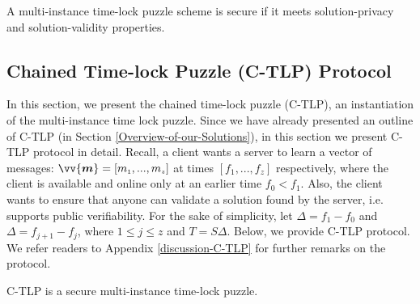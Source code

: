 % 
\begin{definition}\label{def::C-TLP-security} A multi-instance time-lock puzzle scheme  is secure if it meets solution-privacy and solution-validity properties. 
\end{definition}

\vspace{-6mm}

\subsection{Chained  Time-lock Puzzle (C-TLP) Protocol}\label{Section::C-TLP-protocol}

\vspace{-1mm}

In this section, we present the chained  time-lock puzzle (C-TLP), an instantiation of the multi-instance time lock puzzle. Since we have already presented an outline of C-TLP (in Section \ref{Overview-of-our-Solutions}), in this section we present C-TLP protocol in detail.  Recall, a client wants a server to learn a vector of messages: $\vv{\bm{m}}=[m_{\scriptscriptstyle 1},...,m_{\scriptscriptstyle z}]$ at times  $[f_{\scriptscriptstyle 1},...,f_{\scriptscriptstyle z}]$ respectively, where the client is available and online only at an earlier time $f_{\scriptscriptstyle 0}< f_{\scriptscriptstyle 1}$.  Also, the client wants to ensure that anyone can validate a solution found by the  server, i.e. supports public verifiability. For the sake of simplicity, let $\Delta=f_{\scriptscriptstyle 1}-f_{\scriptscriptstyle 0}$ and $\Delta=f_{\scriptscriptstyle j+1}-f_{\scriptscriptstyle j}$, where $1\leq j \leq z$ and $T=S \Delta$. Below, we provide C-TLP protocol. We refer readers to Appendix \ref{discussion-C-TLP} for further remarks on the protocol. 



\vspace{-3mm}

   \begin{theorem}\label{C-TLP-Sec}  C-TLP  is a secure multi-instance time-lock puzzle. 
   \end{theorem}


